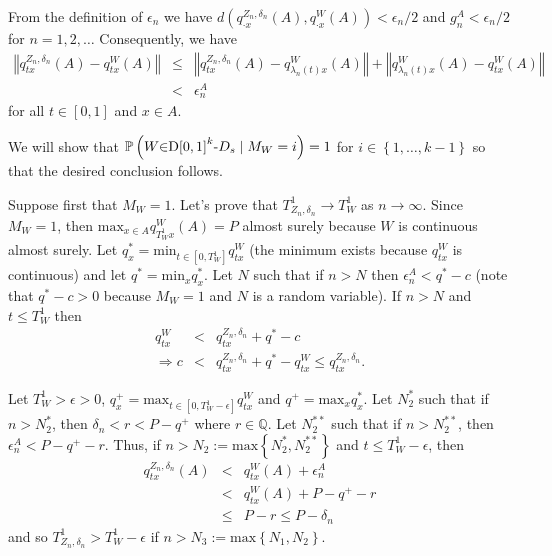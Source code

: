 \documentclass[11pt,english]{article}
\begin{document}
From the definition of $\epsilon_{n}$ we have $d\left(q_{\cdot x}^{Z_{n},\delta_{n}}\left(A\right),q_{\cdot x}^{W}\left(A\right)\right)<\epsilon_{n}/2$
and $g_{n}^{A}<\epsilon_{n}/2$ for $n=1,2,\ldots$ Consequently,
we have 
\begin{eqnarray*}
\left\Vert q_{tx}^{Z_{n},\delta_{n}}\left(A\right)-q_{tx}^{W}\left(A\right)\right\Vert  & \leq & \left\Vert q_{tx}^{Z_{n},\delta_{n}}\left(A\right)-q_{\lambda_{n}\left(t\right)x}^{W}\left(A\right)\right\Vert +\left\Vert q_{\lambda_{n}\left(t\right)x}^{W}\left(A\right)-q_{tx}^{W}\left(A\right)\right\Vert \\
 & < & \epsilon_{n}^{A}
\end{eqnarray*}
for all $t\in\left[0,1\right]$ and $x\in A$.

We will show that $\mathbb{P}\left(W\text{\ensuremath{\in}D\ensuremath{\left[0,1\right]^{k}}-}D_{s}\mid M_{W}=i\right)=1$
for $i\in\left\{ 1,\ldots,k-1\right\} $ so that the desired conclusion
follows.

Suppose first that $M_{W}=1$. Let's prove that $T_{Z_{n},\delta_{n}}^{1}\rightarrow T_{W}^{1}$
as $n\rightarrow\infty$. Since $M_{W}=1$, then $\mbox{max}_{x\in A}q_{T_{W}^{1}x}^{W}\left(A\right)=P$
almost surely because $W$ is continuous almost surely. Let $q_{x}^{*}=\mbox{min}_{t\in\left[0,T_{W}^{1}\right]}q_{tx}^{W}$
(the minimum exists because $q_{tx}^{W}$ is continuous) and let $q^{*}=\mbox{min}_{x}q_{x}^{*}$.
Let $N$ such that if $n>N$ then $\epsilon_{n}^{A}<q^{*}-c$ (note
that $q^{*}-c>0$ because $M_{W}=1$ and $N$ is a random variable).
If $n>N$ and $t\leq T_{W}^{1}$ then
\begin{eqnarray*}
q_{tx}^{W} & < & q_{tx}^{Z_{n},\delta_{n}}+q^{*}-c\\
\Rightarrow c & < & q_{tx}^{Z_{n},\delta_{n}}+q^{*}-q_{tx}^{W}\leq q_{tx}^{Z_{n},\delta_{n}}.
\end{eqnarray*}


Let $T_{W}^{1}>\epsilon>0$, $q_{x}^{+}=\mbox{max}_{t\in\left[0,T_{W}^{1}-\epsilon\right]}q_{tx}^{W}$
and $q^{+}=\mbox{max}_{x}q_{x}^{*}$. Let $N_{2}^{*}$ such that if
$n>N_{2}^{*}$, then $\delta_{n}<r<P-q^{+}$ where $r\in\mathbb{Q}$.
Let $N_{2}^{**}$ such that if $n>N_{2}^{**}$, then $\epsilon_{n}^{A}<P-q^{+}-r$.
Thus, if $n>N_{2}:=\mbox{max}\left\{ N_{2}^{*},N_{2}^{**}\right\} $
and $t\leq T_{W}^{1}-\epsilon$, then
\begin{eqnarray*}
q_{tx}^{Z_{n},\delta_{n}}\left(A\right) & < & q_{tx}^{W}\left(A\right)+\epsilon_{n}^{A}\\
 & < & q_{tx}^{W}\left(A\right)+P-q^{+}-r\\
 & \leq & P-r\leq P-\delta_{n}
\end{eqnarray*}
and so $T_{Z_{n},\delta_{n}}^{1}>T_{W}^{1}-\epsilon$ if $n>N_{\text{3}}:=\mbox{max}\left\{ N_{1},N_{2}\right\} $.
\end{document}
